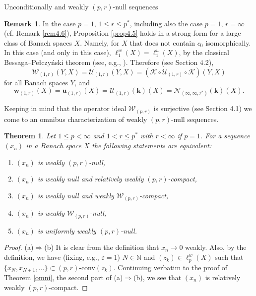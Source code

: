 \documentclass[a4paper,11pt]{amsart}
\newtheorem{thm}[prop]{Theorem}
\theoremstyle{definition}
\newtheorem{rem}[prop]{Remark}
\theoremstyle{definition}
\theoremstyle{definition}
\begin{document}
\begin{section}{Unconditionally and weakly ${{(p,r)}}$-null sequences}
\begin{rem}\label{rem4.7}
In the case $p=1$, $1\leq r \leq {p^{\ast}}$, including also the case $p=1$, $r=\infty$ (cf. Remark \ref{rem4.6}), Proposition \ref{prop4.5} holds in a strong form for a large class of Banach spaces $X$. Namely, for $X$ that does not contain $c_0$ isomorphically. In this case (and only in this case), $\ell_1 ^w (X)=\ell_1^u(X)$, by the classical Bessaga--Pe{\l}czy\'{n}ski theorem \cite[Theorem~5]{BP} (see, e.g., \cite[8.3]{DF}). Therefore (see Section 4.2),
\[
{{\mathcal W}}_{(1,r)}(Y,X)={{\mathcal U}}_{(1,r)}(Y,X)=({{\mathcal K}}\circ {{\mathcal U}}_{(1,r)}\circ {{\mathcal K}})(Y,X)
\]
for all Banach spaces $Y$, and
\[
{\boldsymbol{w}}_{(1,r)}(X)= {\boldsymbol{u}}_{(1,r)}(X) ={{\mathcal U}}_{(1,r)}({\boldsymbol{k}})(X)= {{\mathcal N}}_{(\infty, \infty, {r^{\ast}})}({\boldsymbol{k}})(X).
\]
\end{rem}

Keeping in mind that the operator ideal ${{\mathcal W}}_{{(p,r)}}$ is surjective (see Section 4.1) we come to an omnibus characterization of weakly ${{(p,r)}}$-null sequences.

\begin{thm}\label{thm4.8}
Let $1\leq p < \infty$ and $1 < r \leq {p^{\ast}}$ with $r< \infty$ if $p=1$. For a sequence $(x_n)$ in a Banach space $X$ the following statements are equivalent:
\begin{enumerate}
\item $(x_n)$ is weakly $(p,r)$-null,
\item $(x_n)$ is weakly null and relatively weakly $(p,r)$-compact,
\item $(x_n)$ is weakly null and weakly ${{\mathcal W}}_{{(p,r)}}$-compact,
\item $(x_n)$ is weakly ${{\mathcal W}}_{{(p,r)}}$-null,
\item $(x_n)$ is uniformly weakly $(p,r)$-null.
\end{enumerate}
\end{thm}

\begin{proof}
(a)$\Rightarrow$(b) It is clear from the definition that $x_n{\rightarrow} 0$ weakly. Also, by the definition, we have (fixing, e.g., ${\varepsilon}=1$) $N\in {{\mathbb N}}$ and $(z_k)\in \ell_p^w(X)$ such that $\{x_N, x_{N+1}, ...\}\subset(p,r)$-conv$(z_k)$. Continuing verbatim to the proof of Theorem \ref{omni}, the second part of (a)$\Rightarrow $(b), we see that $(x_n)$ is relatively weakly ${{(p,r)}}$-compact.


\end{proof}
\end{section}
\end{document}
